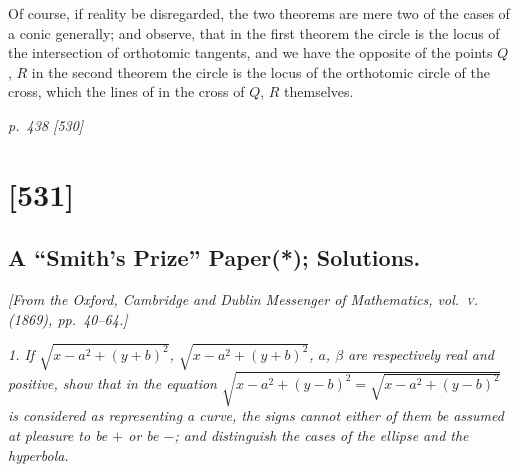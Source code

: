 \documentclass[11pt,a4paper]{article}
\theoremstyle{plain}
\theoremstyle{definition}
\begin{document}
Of course, if reality be disregarded, the two theorems are mere two of the cases of a conic generally; and observe, that in the first theorem the circle is the locus of the intersection of orthotomic tangents, and we have the opposite of the points $Q$, $R$ in the second theorem the circle is the locus of the orthotomic circle of the cross, which the lines of in the cross of $Q$, $R$ themselves.

\clearpage

\bigskip
\textit{p.~438 [530]}
\smallskip

\section{[531]}
\subsection{A ``Smith's Prize'' Paper(*); Solutions.}

\begin{center}
\textit{[From the Oxford, Cambridge and Dublin Messenger of Mathematics, vol.~\textsc{v}. (1869), pp.~40--64.]}
\end{center}

\textit{1. If $\sqrt{x - a^2 + (y + b)^2}$, $\sqrt{x - a^2 + (y + b)^2}$, $a$, $\beta$ are respectively real and positive, show that in the equation $\sqrt{x - a^2 + (y - b)^2 = \sqrt{x - a^2 + (y - b)^2}}$ is considered as representing a curve, the signs cannot either of them be assumed at pleasure to be $+$ or be $-$; and distinguish the cases of the ellipse and the hyperbola.}
\end{document}
